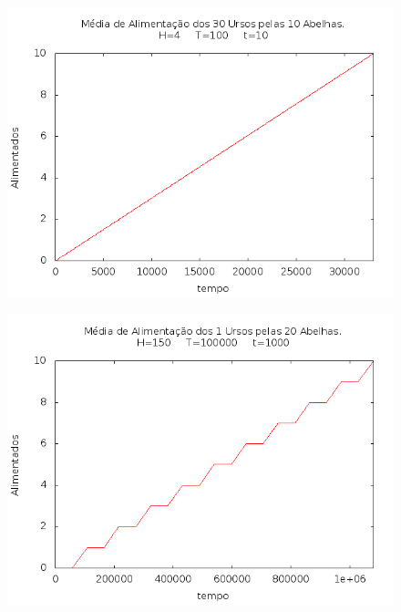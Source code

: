 \documentclass[12pt,a4paper]{article}
\begin{document}
\begin{figure}[!htb]
\centering
\includegraphics[width=0.7\paperwidth]{./graficos/ursos_10_30_4_10_100.png}
\label{Rotulo}
\end{figure}

\begin{figure}[!htb]
\centering
\includegraphics[width=0.7\paperwidth]{./graficos/ursos_20_1_150_1000_100000.png}
\label{Rotulo}
\end{figure}
\end{document}
